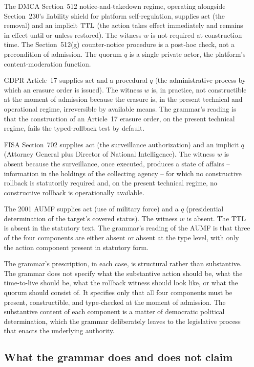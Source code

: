 The DMCA Section~512 notice-and-takedown regime, operating alongside Section~230's liability shield
for platform self-regulation, supplies $\text{act}$ (the removal) and an implicit $\mathrm{TTL}$
(the action takes effect immediately and remains in effect until or unless restored).
The witness $w$ is not required at construction time.
The Section~512(g) counter-notice procedure is a post-hoc check, not a precondition of admission.
The quorum $q$ is a single private actor, the platform's content-moderation function.

GDPR Article~17 supplies $\text{act}$ and a procedural $q$ (the administrative process by which an erasure order
is issued).
The witness $w$ is, in practice, not constructible at the moment of admission because the erasure is, in the
present technical and operational regime, irreversible by available means.
The grammar's reading is that the construction of an Article~17 erasure order, on the present technical regime,
fails the typed-rollback test by default.

FISA Section~702 supplies $\text{act}$ (the surveillance authorization) and an implicit $q$ (Attorney General
plus Director of National Intelligence).
The witness $w$ is absent because the surveillance, once executed, produces a state of affairs --
information in the holdings of the collecting agency -- for which no constructive rollback is statutorily
required and, on the present technical regime, no constructive rollback is operationally available.

The 2001 AUMF supplies $\text{act}$ (use of military force) and a $q$ (presidential determination of the
target's covered status).
The witness $w$ is absent.
The $\mathrm{TTL}$ is absent in the statutory text.
The grammar's reading of the AUMF is that three of the four components are either absent or absent at the
type level, with only the action component present in statutory form.

The grammar's prescription, in each case, is structural rather than substantive.
The grammar does not specify what the substantive action should be, what the time-to-live should be,
what the rollback witness should look like, or what the quorum should consist of.
It specifies only that all four components must be present, constructible, and type-checked at the moment
of admission.
The substantive content of each component is a matter of democratic political determination,
which the grammar deliberately leaves to the legislative process that enacts the underlying authority.

\subsection{What the grammar does and does not claim}


